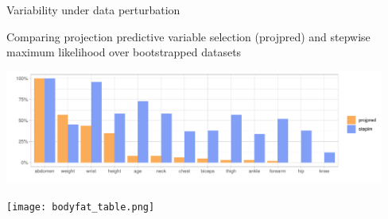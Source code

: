 \documentclass[t]{beamer}
\DeclareMathOperator{\N}{N}
\begin{document}



\begin{frame}{Variability under data perturbation}

   Comparing projection predictive variable selection (projpred)
    and stepwise maximum likelihood over bootstrapped datasets

  \vspace{-0.5\baselineskip}
  \begin{minipage}[t]{1\linewidth}
      \hspace{-1cm}
      \includegraphics[width=12.5cm]{inc_prob.pdf}
    \end{minipage}
    \pause
  \begin{minipage}[t]{1\linewidth}
      \hspace{-0.9cm}
      \texttt{[image: bodyfat\_table.png]}
    \end{minipage}

  \end{frame}
\end{document}

